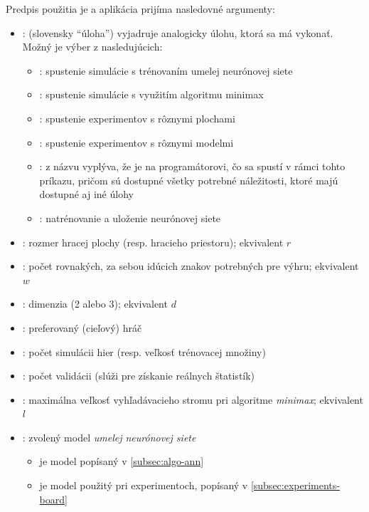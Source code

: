 Predpis použitia je  a aplikácia prijíma nasledovné
argumenty:
\begin{itemize}
    \item {}: (slovensky \enquote{úloha}) vyjadruje analogicky úlohu, ktorá sa má vykonať.
    Možný je výber z nasledujúcich:
    \begin{itemize}
        \item {}: spustenie simulácie s trénovaním umelej neurónovej siete
        \item {}: spustenie simulácie s využitím algoritmu minimax
        \item {}: spustenie experimentov s rôznymi plochami
        \item {}: spustenie experimentov s rôznymi modelmi
        \item {}: z názvu vyplýva, že je na programátorovi, čo sa spustí v rámci tohto príkazu, pričom sú
        dostupné všetky potrebné náležitosti, ktoré majú dostupné aj iné úlohy
        \item {}: natrénovanie a uloženie neurónovej siete
    \end{itemize}
    \item {}: rozmer hracej plochy (resp. hracieho priestoru); ekvivalent $r$
    \item {}: počet rovnakých, za sebou idúcich znakov potrebných pre výhru; ekvivalent $w$
    \item {}: dimenzia (2 alebo 3); ekvivalent $d$
    \item {}: preferovaný (cieľový) hráč
    \item {}: počet simulácii hier (resp. veľkosť trénovacej množiny)
    \item {}: počet validácii (slúži pre získanie reálnych štatistík)
    \item {}: maximálna veľkosť vyhľadávacieho stromu pri algoritme \emph{minimax};
    ekvivalent $l$
    \item {}: zvolený model \emph{umelej neurónovej siete}
    \begin{itemize}
        \item {} je model popísaný v \autoref{subsec:algo-ann}
        \item {} je model použitý pri experimentoch, popísaný v \autoref{subsec:experiments-board}
    \end{itemize}
\end{itemize}

